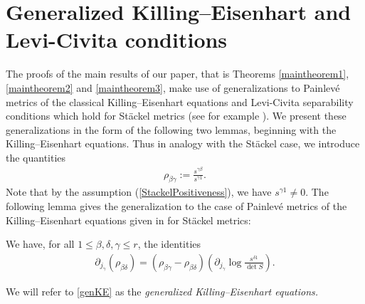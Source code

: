 \section{Generalized Killing--Eisenhart and Levi-Civita conditions}

The proofs of the main results of our paper, that is Theorems \ref{maintheorem1}, \ref{maintheorem2} and \ref{maintheorem3}, make use of generalizations to Painlev\'e metrics of the classical Killing--Eisenhart equations and Levi-Civita separability conditions which hold for St\"ackel metrics (see for example \cite{BCR1-2002, BCR2-2002, Eis1934, KaMi1980, KaMi1981, Per1990}). We present these generalizations in the form of the following two lemmas, beginning with the Killing--Eisenhart equations. Thus in analogy with the St\"ackel case, we introduce the quantities
\begin{gather}\label{defrho}
\rho_{\beta \gamma}:=\frac{s^{\gamma \beta}}{s^{\gamma 1}}.
\end{gather}
Note that by the assumption (\ref{StackelPositiveness}), we have $s^{\gamma 1}\neq 0$.
The following lemma gives the generalization to the case of Painlev\'e metrics of the Killing--Eisenhart equations given in \cite{BCR1-2002,BCR2-2002,Eis1934,KaMi1980,KaMi1981} for St\"ackel metrics:
\begin{Lemma} \label{KE}
We have, for all $1\leq \beta, \delta, \gamma \leq r$, the identities
\begin{gather}\label{genKE}
\partial_{j_{\gamma}}(\rho_{ \beta \delta})= (\rho_{\beta \gamma}-\rho_{\beta \delta })\left(\partial_{j_{\gamma}}{\log \frac{s^{\delta 1}}{\det S}}\right).
\end{gather}
\end{Lemma}
We will refer to \eqref{genKE} as the {\emph{generalized Killing--Eisenhart equations.}}
